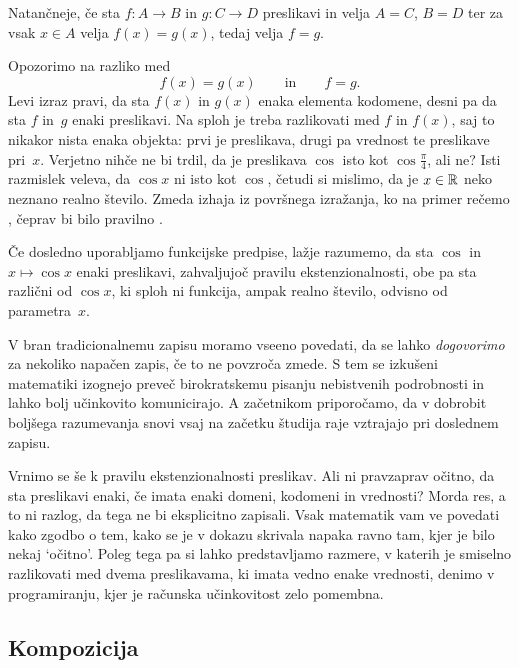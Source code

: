 Natančneje, če sta $f : A \to B$ in $g : C \to D$ preslikavi in velja $A = C$, $B = D$ ter
za vsak $x \in A$ velja $f(x) = g(x)$, tedaj velja $f = g$.

Opozorimo na razliko med
%
\begin{equation*}
  f(x) = g(x)
  \qquad\text{in}\qquad
  f = g.
\end{equation*}
%
Levi izraz pravi, da sta $f(x)$ in $g(x)$ enaka elementa kodomene, desni pa da sta $f$ in~$g$ enaki preslikavi.
%
Na sploh je treba razlikovati med $f$ in $f(x)$, saj to nikakor nista enaka objekta: prvi je
preslikava, drugi pa vrednost te preslikave pri~$x$. Verjetno nihče ne bi trdil, da je
preslikava $\cos$ isto kot $\cos \frac{\pi}{4}$, ali ne? Isti razmislek veleva, da
$\cos x$ ni isto kot $\cos$, četudi si mislimo, da je $x \in \mathbb{R}$ neko neznano realno število.
Zmeda izhaja iz površnega izražanja, ko na primer rečemo , čeprav bi bilo pravilno .

Če dosledno uporabljamo funkcijske predpise, lažje razumemo, da sta $\cos$ in $x \mapsto \cos x$ enaki preslikavi, zahvaljujoč pravilu ekstenzionalnosti, obe pa sta različni od $\cos x$, ki sploh ni funkcija, ampak realno število, odvisno od parametra~$x$.

V bran tradicionalnemu zapisu moramo vseeno povedati, da se lahko \emph{dogovorimo} za
nekoliko napačen zapis, če to ne povzroča zmede. S tem se izkušeni matematiki izognejo preveč birokratskemu
pisanju nebistvenih podrobnosti in lahko bolj učinkovito komunicirajo.
%
A začetnikom priporočamo, da v dobrobit boljšega razumevanja snovi vsaj na začetku študija raje vztrajajo pri doslednem zapisu.

Vrnimo se še k pravilu ekstenzionalnosti preslikav. Ali ni pravzaprav očitno, da sta
preslikavi enaki, če imata enaki domeni, kodomeni in vrednosti? Morda res, a to ni razlog,
da tega ne bi eksplicitno zapisali. Vsak matematik vam ve povedati kako zgodbo o tem,
kako se je v dokazu skrivala napaka ravno tam, kjer je bilo nekaj `očitno'. Poleg tega
pa si lahko predstavljamo razmere, v katerih je smiselno razlikovati med dvema
preslikavama, ki imata vedno enake vrednosti, denimo v programiranju, kjer je računska učinkovitost
zelo pomembna.

\subsection{Kompozicija}
\label{sec:kompozicija}

